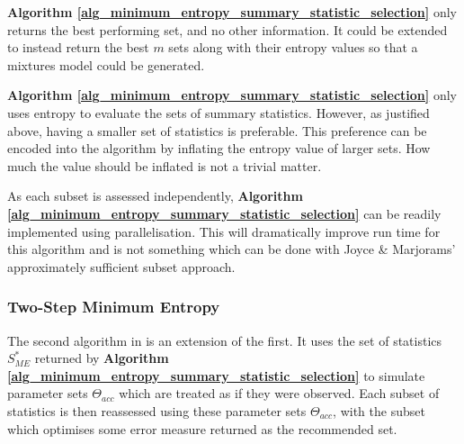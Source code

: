 \documentclass[bibliography=totoc,11pt,a4paper,margin=0]{article}
\theoremstyle{break}
\begin{document}
  \par \textbf{Algorithm \ref{alg_minimum_entropy_summary_statistic_selection}} only returns the best performing set, and no other information. It could be extended to instead return the best $m$ sets along with their entropy values so that a mixtures model could be generated.

  \par \textbf{Algorithm \ref{alg_minimum_entropy_summary_statistic_selection}} only uses entropy to evaluate the sets of summary statistics. However, as justified above, having a smaller set of statistics is preferable. This preference can be encoded into the algorithm by inflating the entropy value of larger sets. How much the value should be inflated is not a trivial matter. %

  \par As each subset is assessed independently, \textbf{Algorithm \ref{alg_minimum_entropy_summary_statistic_selection}} can be readily implemented using parallelisation. This will dramatically improve run time for this algorithm and is not something which can be done with Joyce \& Marjorams' approximately sufficient subset approach.


\subsubsection{Two-Step Minimum Entropy}\label{sec_two_step_minimum_entropy}

  \par The second algorithm in \cite[]{on_optimal_selection_of_summary_stats_for_ABC} is an extension of the first. It uses the set of statistics $S_{ME}^*$ returned by \textbf{Algorithm \ref{alg_minimum_entropy_summary_statistic_selection}} to simulate parameter sets $\Theta_{acc}$ which are treated as if they were observed. Each subset of statistics is then reassessed using these parameter sets $\Theta_{acc}$, with the subset which optimises some error measure returned as the recommended set.
\end{document}

